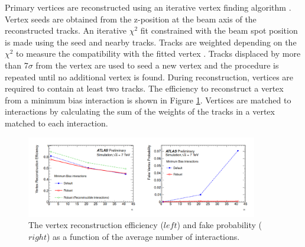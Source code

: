 Primary vertices are reconstructed using an iterative vertex finding algorithm \cite{Vrtx_Eff}. Vertex seeds are obtained from the z-position at the beam axis of the reconstructed tracks. An iterative $\chi^2$ fit constrained with the beam spot position is made using the seed and nearby tracks. Tracks are weighted depending on the $\chi^2$ to measure the compatibility with the fitted vertex \cite{chi2}. Tracks displaced by more than 7$\sigma$ from the vertex are used to seed a new vertex and the procedure is repeated until no additional vertex is found. During reconstruction, vertices are required to contain at least two tracks. The efficiency to reconstruct a vertex from a minimum bias interaction is shown in Figure \ref{fig:chap2:Objects:Vtx:Eff}. Vertices are matched to interactions by calculating the sum of the weights of the tracks in a vertex matched to each interaction. 
\begin{figure}[htbp]
    \centering
    \includegraphics[width=0.9\textwidth]{Ch2/Img/Vtx_Reco_Eff.png}
    \caption{The vertex reconstruction efficiency ($left$) and fake probability ($right$) as a function of the average number of interactions.}
    \label{fig:chap2:Objects:Vtx:Eff}
\end{figure}

